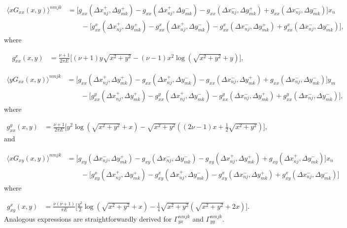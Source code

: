 \documentclass[aps,prl,reprint,groupedaddress,twocolumn]{revtex4-1}
\begin{document}
\begin{appendix}
\begin{align}
\langle xG_{xx}(x,y) \rangle^{nmjk} & =\Big[g_{xx}(\Delta x_{nj}^+,\Delta y_{mk}^+)
- g_{xx}(\Delta x_{nj}^+,\Delta y_{mk}^-)
-g_{xx}(\Delta x_{nj}^-, \Delta y_{mk}^+)+ g_{xx}
(\Delta x_{nj}^- , \Delta y_{mk}^-)\Big] x_n\nonumber\\
\: &\qquad - \Big[g^x_{xx}( \Delta x_{nj}^+ , \Delta y_{mk}^+)- 
g^x_{xx}(\Delta x_{nj}^+ , \Delta y_{mk}^-)-
g^x_{xx}(\Delta x_{nj}^-, \Delta y_{mk}^+) + 
g^x_{xx}(\Delta x_{nj}^- , \Delta y_{mk}^-)\Big],\tag{B9}
\end{align}
%
where

\begin{align}
g^x_{xx}(x,y) &= \frac{\nu+1}{2\pi E} \Big[ (\nu+1)y\sqrt{x^2 + y^2}
- (\nu-1) x^2\log\left(\sqrt{x^2 + y^2} +y  \right)  \Big],\label{eq:fxxx}\tag{B10}
\end{align}

\begin{align}
\langle yG_{xx}(x,y) \rangle^{nmjk} & = 
\Big[g_{xx}(\Delta x_{nj}^{+},\Delta y_{mk}^+)-g_{xx}(\Delta x_{nj}^+,\Delta y_{mk}^-)
-g_{xx}(\Delta x_{nj}^{-}, \Delta y_{mk}^+) + 
g_{xx}(\Delta x_{nj}^{-}, \Delta y_{mk}^-)\Big] y_m\nonumber\\
\: &\qquad - \Big[ g^y_{xx}(\Delta x_{nj}^+,\Delta y_{mk}^+) 
- g^y_{xx}(\Delta x_{nj}^+,\Delta y_{mk}^-)
- g^y_{xx}(\Delta x_{nj}^-,\Delta y_{mk}^+) 
+ g^y_{xx}(\Delta x_{nj}^-,\Delta y_{mk}^-)\Big],\tag{B11}
\end{align}
%
where

\begin{align}
g^y_{xx}(x,y) &=\frac{\nu+1}{2\pi E} \Bigg[y^2\log\left(\sqrt{x^2+y^2}+x \right)
-\sqrt{x^2+y^2}\left((2\nu-1)x + \frac{1}{2}\sqrt{x^2+y^2} \right)  \Bigg], \label{eq:fyxx}\tag{B12}
\end{align}
%
and

\begin{align}
\langle xG_{xy}(x,y)\rangle^{nmjk} & = 
\Big[g_{xy}(\Delta x_{nj}^{-},\Delta y_{mk}^+)-g_{xy}(\Delta x_{nj}^{-},\Delta y_{mk}^-)
- g_{xy}(\Delta x_{nj}^{+},\Delta y_{mk}^+) + g_{xy}(\Delta x_{nj}^+,\Delta y_{mk}^-) \Big]x_n \nonumber\\
\: & \qquad -\Big[g_{xy}^x(\Delta x_{nj}^{+},\Delta y_{mk}^+) - g_{xy}^x(\Delta x_{nj}^{+},\Delta y_{mk}^-)
-g_{xy}^x(\Delta x_{nj}^{-},\Delta y_{mk}^+)+g_{xy}^x(\Delta x_{nj}^{-},\Delta y_{mk}^-)\Big]\tag{B13}
\end{align}
%
where

\begin{align}
g_{xy}^x(x,y) &=\frac{\nu(\nu+1)}{\pi E}\Big[ \frac{y^2}{2}\log\left(\sqrt{x^2+y^2} +x\right)
-\frac{1}{4}\sqrt{x^2+y^2}\left(\sqrt{x^2+y^2}+2x\right) \Big]. \label{eq:fxxy}\tag{B14}
\end{align}
Analogous expressions are straightforwardly derived for
$\Gamma_{yx}^{nmjk}$ and $\Gamma_{yy}^{nmjk}$.


\end{appendix}
\end{document}
